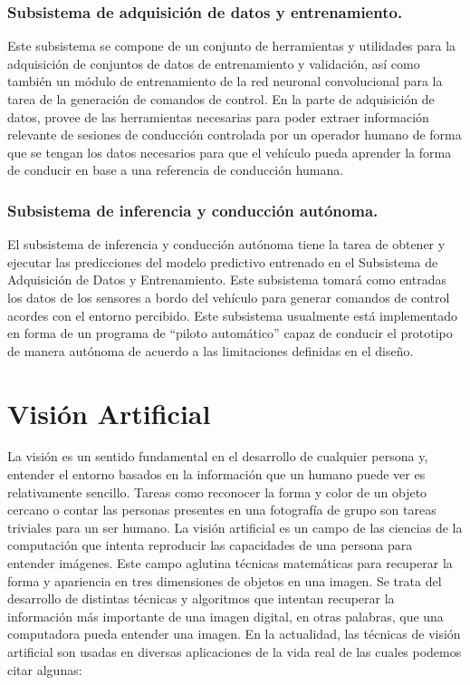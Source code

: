         \subsubsection{Subsistema de adquisición de datos y entrenamiento.}
        Este subsistema se compone de un conjunto de herramientas y utilidades para la 
        adquisición de conjuntos de datos de entrenamiento y validación, así como
        también un módulo de entrenamiento de la red neuronal convolucional para la tarea de
        la generación de comandos de control. En la parte de adquisición de datos, provee de las herramientas necesarias 
        para poder extraer información relevante de sesiones de conducción controlada por un operador humano de forma 
        que se tengan los datos necesarios para que el vehículo pueda aprender la forma de conducir en base a una referencia 
        de conducción humana.

        \subsubsection{Subsistema de inferencia y conducción autónoma.}
        El subsistema de inferencia y conducción autónoma tiene la tarea de obtener y ejecutar
        las predicciones del modelo predictivo entrenado en el Subsistema de Adquisición de Datos y Entrenamiento.
        Este subsistema tomará como entradas los datos de los 
        sensores a bordo del vehículo para generar comandos de control acordes con el entorno
        percibido. Este subsistema usualmente está implementado en forma de un programa de ``piloto automático''
        capaz de conducir el prototipo de manera autónoma de acuerdo a las limitaciones definidas en el diseño.

\section{Visión Artificial}
La visión es un sentido fundamental en el desarrollo de cualquier persona y, entender el entorno basados en la información que 
un humano puede ver es relativamente sencillo. Tareas como reconocer la forma y color de un objeto cercano o contar las personas 
presentes en una fotografía de grupo son tareas triviales para un ser humano. La visión artificial es un campo de 
las ciencias de la computación que intenta reproducir las capacidades de una persona para entender imágenes. Este campo
aglutina técnicas matemáticas para recuperar la forma y apariencia en tres dimensiones de objetos en una imagen. Se trata 
del desarrollo de distintas técnicas y algoritmos que intentan recuperar la información más importante de una imagen digital, 
en otras palabras, que una computadora pueda entender una imagen. En la actualidad, las técnicas de visión artificial son 
usadas en diversas aplicaciones de la vida real de las cuales podemos citar algunas:

